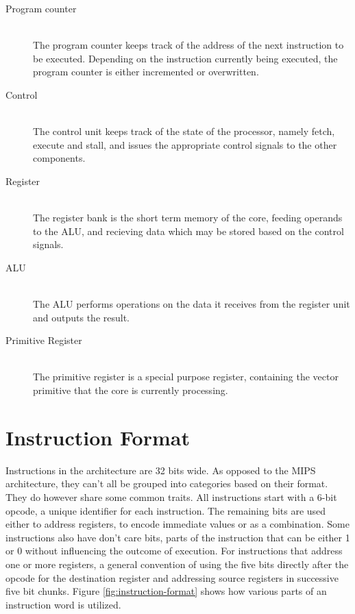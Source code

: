 \begin{description}
    \item[Program counter] \hfill \\
        The program counter keeps track of the address of the next instruction to be executed.
        Depending on the instruction currently being executed, the program counter is either incremented or overwritten.
    \item[Control] \hfill \\
        The control unit keeps track of the state of the processor, namely fetch, execute and stall, and issues the appropriate control signals to the other components.
    \item[Register] \hfill \\
        The register bank is the short term memory of the core, feeding operands to the ALU, and recieving data which may be stored based on the control signals.
    \item[ALU] \hfill \\
        The ALU performs operations on the data it receives from the register unit and outputs the result.
    \item[Primitive Register] \hfill \\
        The primitive register is a special purpose register, containing the vector primitive that the core is currently processing.
\end{description}

\section{Instruction Format}

Instructions in the \vthreek architecture are 32 bits wide.
As opposed to the MIPS architecture, they can't all be grouped into categories based on their format.
They do however share some common traits.
All instructions start with a 6-bit opcode, a unique identifier for each instruction.
The remaining bits are used either to address registers, to encode immediate values or as a combination.
Some instructions also have don't care bits, parts of the instruction that can be either 1 or 0 without influencing the outcome of execution.
For instructions that address one or more registers, a general convention of using the five bits directly after the opcode for the destination register and addressing source registers in successive five bit chunks.
Figure \ref{fig:instruction-format} shows how various parts of an instruction word is utilized.

